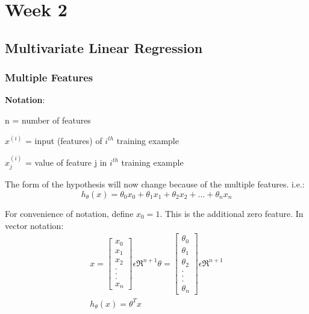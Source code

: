 \maketitle
\chapter{Week 2}
\section{Multivariate Linear Regression}
\subsection{Multiple Features}

\textbf{Notation}:

n = number of features

$x^{(i)}$ = input (features) of $i^{th}$ training example

$x_j^{(i)}$ = value of feature j in $i^{th}$ training example

The form of the hypothesis will now change because of the multiple features. i.e.:
\begin{equation}
	h_\theta(x) = \theta_0x_0 + \theta_1x_1 + \theta_2x_2 + . . . + \theta_nx_n
	\label{eq:2.1}
\end{equation}

For convenience of notation, define $x_0 = 1$. This is the additional zero feature. In vector notation:
\begin{equation}
	\begin{split}
	x = 
    \begin{bmatrix}
        x_0 \\ x_1 \\ x_2 \\ . \\ . \\ . \\ x_n
    \end{bmatrix}
    \epsilon  \Re^{n+1}   
    \theta = 
    \begin{bmatrix}
        \theta_0 \\ \theta_1 \\ \theta_2 \\ . \\ . \\ . \\ \theta_n
    \end{bmatrix}
    \epsilon  \Re^{n+1}
    \\
    h_\theta(x) = \theta^Tx
    \end{split}
\end{equation}
